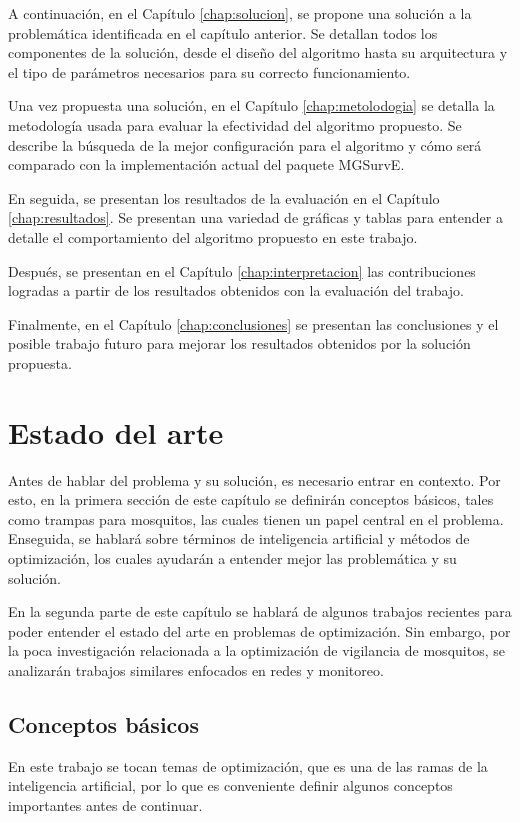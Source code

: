 A continuación, en el Capítulo \ref{chap:solucion}, se propone una solución
a la problemática identificada en el capítulo anterior. Se detallan todos los
componentes de la solución, desde el diseño del algoritmo hasta su
arquitectura y el tipo de parámetros necesarios para su correcto
funcionamiento.

Una vez propuesta una solución, en el Capítulo \ref{chap:metolodogia} se
detalla la metodología usada para evaluar la efectividad del algoritmo
propuesto. Se describe la búsqueda de la mejor configuración para el algoritmo
y cómo será comparado con la implementación actual del paquete MGSurvE.

En seguida, se presentan los resultados de la evaluación en el Capítulo
\ref{chap:resultados}. Se presentan una variedad de gráficas y tablas para
entender a detalle el comportamiento del algoritmo propuesto en este trabajo.

Después, se presentan en el Capítulo \ref{chap:interpretacion} las
contribuciones logradas a partir de los resultados obtenidos con la evaluación
del trabajo.

Finalmente, en el Capítulo \ref{chap:conclusiones} se presentan las
conclusiones y el posible trabajo futuro para mejorar los resultados obtenidos
por la solución propuesta.

\chapter{Estado del arte}\label{chap:estado-del-arte}
Antes de hablar del problema y su solución, es necesario entrar en contexto.
Por esto, en la primera sección de este capítulo se definirán conceptos
básicos, tales como trampas para mosquitos, las cuales tienen un papel central
en el problema. Enseguida, se hablará sobre términos de inteligencia
artificial y métodos de optimización, los cuales ayudarán a entender mejor las
problemática y su solución.

En la segunda parte de este capítulo se hablará de algunos trabajos recientes
para poder entender el estado del arte en problemas de optimización. Sin
embargo, por la poca investigación relacionada a la optimización de vigilancia
de mosquitos, se analizarán trabajos similares enfocados en redes y
monitoreo.

\section{Conceptos básicos}
En este trabajo se tocan temas de optimización, que es una de las ramas de la
inteligencia artificial, por lo que es conveniente definir algunos conceptos
importantes antes de continuar. 

